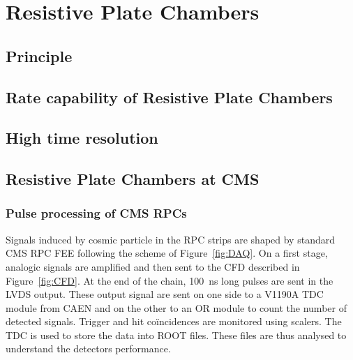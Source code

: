 \graphicspath{{chapt_dutch/}{intro/}{chapt2/}{chapt3/}{chapt4/}{chapt5/}{chapt6/}{chapt7/}}

\renewcommand\evenpagerightmark{{\scshape\small Chapter 4}}
\renewcommand\oddpageleftmark{{\scshape\small Resistive Plate Chambers}}

\renewcommand{\bibname}{References}

\hyphenation{}

\chapter[Resistive Plate Chambers]%
{Resistive Plate Chambers}
\label{chapt:4}

\section{Principle}
\label{sec:principle}

\section{Rate capability of Resistive Plate Chambers}
\label{sec:RateCapa}

\section{High time resolution}
\label{sec:TimeRes}

\section{Resistive Plate Chambers at CMS}
\label{sec:CMS-RPC}

    \subsection{Pulse processing of CMS RPCs}
    \label{ssec:PulseProc}
	
		Signals induced by cosmic particle in the RPC strips are shaped by standard CMS RPC \acf{FEE} following the scheme of Figure~\ref{fig:DAQ}. On a first stage, analogic signals are amplified and then sent to the \acf{CFD} described in Figure~\ref{fig:CFD}. At the end of the chain, \SI{100}{ns} long pulses are sent in the LVDS output. These output signal are sent on one side to a V1190A \acf{TDC} module from CAEN and on the other to an OR module to count the number of detected signals. Trigger and hit coïncidences are monitored using scalers. The TDC is used to store the data into ROOT files. These files are thus analysed to understand the detectors performance.

